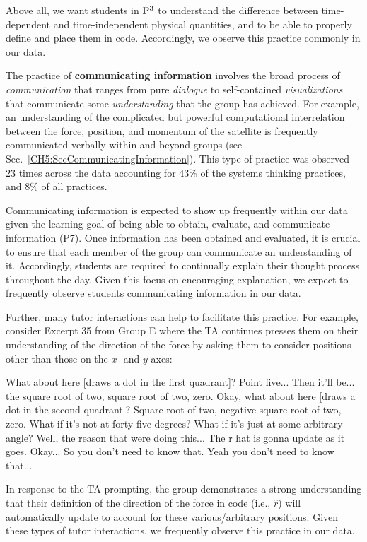 \documentclass{msuphddissertation}
\begin{document}
\begin{doublespace}
Above all, we want students in ${\rm P}^{3}$ to understand the difference between time-dependent and time-independent physical quantities, and to be able to properly define and place them in code.  Accordingly, we observe this practice commonly in our data.

%
%
%

The practice of \textbf{communicating information} involves the broad process of \textit{communication} that ranges from pure \textit{dialogue} to self-contained \textit{visualizations} that communicate some \textit{understanding} that the group has achieved.  For example, an understanding of the complicated but powerful computational interrelation between the force, position, and momentum of the satellite is frequently communicated verbally within and beyond groups (see Sec.~\ref{CH5:SecCommunicatingInformation}).  This type of practice was observed $23$ times across the data  accounting for $43\%$ of the systems thinking practices, and $8\%$ of all practices.

Communicating information is expected to show up frequently within our data given the learning goal of being able to obtain, evaluate, and communicate information (P7).  Once information has been obtained and evaluated, it is crucial to ensure that each member of the group can communicate an understanding of it.  Accordingly, students are required to continually explain their thought process throughout the day.  Given this focus on encouraging explanation, we expect to frequently observe students communicating information in our data.

Further, many tutor interactions can help to facilitate this practice.  For example, consider Excerpt 35 from Group E where the TA continues presses them on their understanding of the direction of the force by asking them to consider positions other than those on the $x$- and $y$-axes: \begin{description}
\TA What about here [draws a dot in the first quadrant]?
\SD Point five...
\SB Then it'll be... the square root of two, square root of two, zero.
\TA Okay, what about here [draws a dot in the second quadrant]?
\SB Square root of two, negative square root of two, zero.
\TA What if it's not at forty five degrees?
\TA What if it's just at some arbitrary angle?
\SB Well, the reason that were doing this...			
\SD The r hat is gonna update as it goes.
\TA Okay...
\SD So you don’t need to know that.
\SB Yeah you don’t need {to know that}...		
\end{description}  In response to the TA prompting, the group demonstrates a strong understanding that their definition of the direction of the force in code (i.e., $\hat{r}$) will automatically update to account for these various/arbitrary positions.  Given these types of tutor interactions, we frequently observe this practice in our data.


\end{doublespace}
\end{document}
